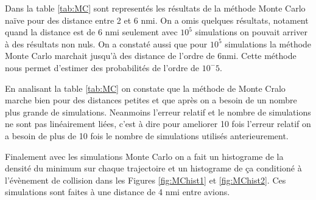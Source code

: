 \documentclass[a4paper, 12pt,twoside]{article}
\numberwithin{equation}{subsection}
\begin{document}
	Dans la table \ref{tab:MC} sont representés les résultats de la méthode Monte Carlo naïve pour des distance entre 2 et 6 nmi. On a omis quelques résultats, notament quand la distance est de 6 nmi seulement avec $10^5$ simulations on pouvait arriver à des résultats non nuls. On a constaté aussi que pour $10^5$ simulations la méthode Monte Carlo marchait jusqu'à des distance de l'ordre de 6nmi. Cette méthode nous permet d'estimer des probabilités de l'ordre de $10^-5$.
	
	En analisant la table \ref{tab:MC} on constate que la méthode de Monte Cralo marche bien pour des distances petites et que après on a besoin de un nombre plus grande de simulations. Neanmoins l'erreur relatif et le nombre de simulations ne sont pas linéairement liées, c'est à dire pour ameliorer 10 fois l'erreur relatif on a besoin de plus de 10 fois le nombre de simulations utilisés anterieurement.
	
	Finalement avec les simulations Monte Carlo on a fait un histograme de la densité du minimum sur chaque trajectoire et un histograme de ça conditioné à l'évènement de collision dans les Figures \ref{fig:MChist1} et \ref{fig:MChist2}. Ces simulations sont faites à une distance de 4 nmi entre avions.
	
\end{document}
